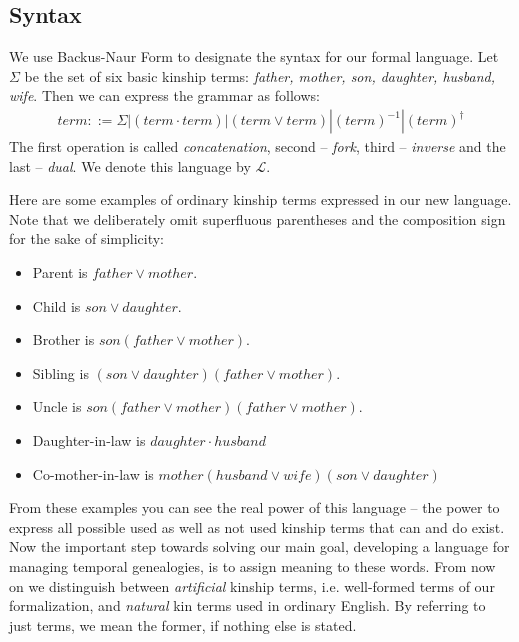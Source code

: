     \subsection{Syntax}
    We use Backus-Naur Form to designate the syntax for our formal language. Let $\Sigma$ be the set of six basic kinship terms:
    \textit{father, mother, son, daughter, husband, wife}. Then we can express the grammar as follows:
    \begin{align*}
    \label{al:syntax}
    term ::= \Sigma | (term \cdot term) | (term \vee term) | (term)^{-1} | (term)^{\dagger}
    \end{align*}
    The first operation is called \textit{concatenation}, second -- \textit{fork}, third -- \textit{inverse} and the last --
    \textit{dual}. We denote this language by $\mathcal{L}$.

    Here are some examples of ordinary kinship terms expressed in our new language. Note that we deliberately omit superfluous
    parentheses and the composition sign for the sake of simplicity:
    \begin{itemize}
        \item{ Parent is $father \vee mother$. }
        \item{ Child is $son \vee daughter$. }
        \item{ Brother is $son (father \vee mother)$. }
        \item{ Sibling is $(son \vee daughter)(father \vee mother)$. }
        \item{ Uncle is $son(father \vee mother)(father \vee mother)$. }
        \item{ Daughter-in-law is $daughter \cdot husband$ }
        \item{ Co-mother-in-law is $mother(husband \vee wife)(son \vee daughter)$ }
    \end{itemize}
    From these examples you can see the real power of this language -- the power to express all possible used as well as not used
    kinship terms that can and do exist. Now the important step towards solving our main goal, developing a language for managing
    temporal genealogies, is to assign meaning to these words. From now on we distinguish between \textit{artificial} kinship terms,
    i.e. well-formed terms of our formalization, and \textit{natural} kin terms used in ordinary English. By referring to just terms,
    we mean the former, if nothing else is stated.


